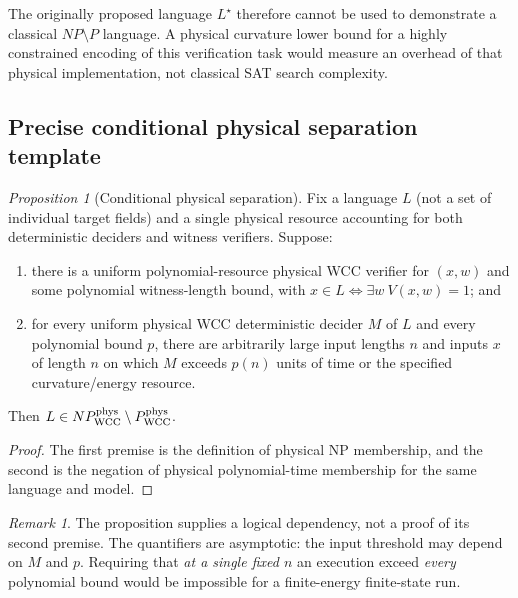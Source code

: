 \documentclass[12pt]{article}
\theoremstyle{remark}
\newtheorem*{remark}{Remark}
\newtheorem{proposition}[theorem]{Proposition}
\begin{document}
The originally proposed language $L^\star$ therefore cannot be
used to demonstrate a classical $NP\setminus P$ language. A
physical curvature lower bound for a highly constrained encoding
of this verification task would measure an overhead of that
physical implementation, not classical SAT search complexity.

\subsection{Precise conditional physical separation template}
\label{sec:corrected-separation}
\begin{proposition}[Conditional physical separation]
\label{thm:curv-bdd-sep}
Fix a language $L$ (not a set of individual target fields) and a
single physical resource accounting for both deterministic deciders
and witness verifiers. Suppose:
\begin{enumerate}
\item there is a uniform polynomial-resource physical WCC verifier
for $(x,w)$ and some polynomial witness-length bound, with
$x\in L\iff\exists w\ V(x,w)=1$; and
\item for every uniform physical WCC deterministic decider $M$ of
$L$ and every polynomial bound $p$, there are arbitrarily large
input lengths $n$ and inputs $x$ of length $n$ on which $M$ exceeds
$p(n)$ units of time or the specified curvature/energy resource.
\end{enumerate}
Then $L\in NP_{\rm WCC}^{\rm phys}\setminus
P_{\rm WCC}^{\rm phys}$.
\end{proposition}
\begin{proof}
The first premise is the definition of physical NP membership,
and the second is the negation of physical polynomial-time
membership for the same language and model.
\end{proof}
\begin{remark}
The proposition supplies a logical dependency, not a proof of
its second premise. The quantifiers are asymptotic: the input
threshold may depend on $M$ and $p$. Requiring that \emph{at a
single fixed $n$} an execution exceed \emph{every} polynomial
bound would be impossible for a finite-energy finite-state run.
\end{remark}
\end{document}
